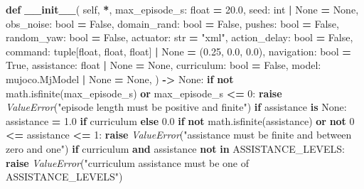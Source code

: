 \documentclass[
  chinese,
  11pt,
  letterpaper,
]{article}
\newenvironment{Shaded}{\begin{snugshade}}{\end{snugshade}}
\newcommand{\BuiltInTok}[1]{#1}
\newcommand{\ControlFlowTok}[1]{\textcolor[rgb]{0.13,0.29,0.53}{\textbf{#1}}}
\newcommand{\DecValTok}[1]{\textcolor[rgb]{0.00,0.00,0.81}{#1}}
\newcommand{\FloatTok}[1]{\textcolor[rgb]{0.00,0.00,0.81}{#1}}
\newcommand{\FunctionTok}[1]{\textcolor[rgb]{0.13,0.29,0.53}{\textbf{#1}}}
\newcommand{\KeywordTok}[1]{\textcolor[rgb]{0.13,0.29,0.53}{\textbf{#1}}}
\newcommand{\NormalTok}[1]{#1}
\newcommand{\OperatorTok}[1]{\textcolor[rgb]{0.81,0.36,0.00}{\textbf{#1}}}
\newcommand{\PreprocessorTok}[1]{\textcolor[rgb]{0.56,0.35,0.01}{\textit{#1}}}
\newcommand{\StringTok}[1]{\textcolor[rgb]{0.31,0.60,0.02}{#1}}
\newcommand{\VariableTok}[1]{\textcolor[rgb]{0.00,0.00,0.00}{#1}}
\renewenvironment{Shaded}{\par\smallskip}{\par\smallskip}
\begin{document}
\begin{Shaded}
\begin{Highlighting}[]
    \KeywordTok{def} \FunctionTok{\_\_init\_\_}\NormalTok{(}
        \VariableTok{self}\NormalTok{,}
        \OperatorTok{*}\NormalTok{,}
\NormalTok{        max\_episode\_s: }\BuiltInTok{float} \OperatorTok{=} \FloatTok{20.0}\NormalTok{,}
\NormalTok{        seed: }\BuiltInTok{int} \OperatorTok{|} \VariableTok{None} \OperatorTok{=} \VariableTok{None}\NormalTok{,}
\NormalTok{        obs\_noise: }\BuiltInTok{bool} \OperatorTok{=} \VariableTok{False}\NormalTok{,}
\NormalTok{        domain\_rand: }\BuiltInTok{bool} \OperatorTok{=} \VariableTok{False}\NormalTok{,}
\NormalTok{        pushes: }\BuiltInTok{bool} \OperatorTok{=} \VariableTok{False}\NormalTok{,}
\NormalTok{        random\_yaw: }\BuiltInTok{bool} \OperatorTok{=} \VariableTok{False}\NormalTok{,}
\NormalTok{        actuator: }\BuiltInTok{str} \OperatorTok{=} \StringTok{"xml"}\NormalTok{,}
\NormalTok{        action\_delay: }\BuiltInTok{bool} \OperatorTok{=} \VariableTok{False}\NormalTok{,}
\NormalTok{        command: }\BuiltInTok{tuple}\NormalTok{[}\BuiltInTok{float}\NormalTok{, }\BuiltInTok{float}\NormalTok{, }\BuiltInTok{float}\NormalTok{] }\OperatorTok{|} \VariableTok{None} \OperatorTok{=}\NormalTok{ (}\FloatTok{0.25}\NormalTok{, }\FloatTok{0.0}\NormalTok{, }\FloatTok{0.0}\NormalTok{),}
\NormalTok{        navigation: }\BuiltInTok{bool} \OperatorTok{=} \VariableTok{True}\NormalTok{,}
\NormalTok{        assistance: }\BuiltInTok{float} \OperatorTok{|} \VariableTok{None} \OperatorTok{=} \VariableTok{None}\NormalTok{,}
\NormalTok{        curriculum: }\BuiltInTok{bool} \OperatorTok{=} \VariableTok{False}\NormalTok{,}
\NormalTok{        model: mujoco.MjModel }\OperatorTok{|} \VariableTok{None} \OperatorTok{=} \VariableTok{None}\NormalTok{,}
\NormalTok{    ) }\OperatorTok{{-}\textgreater{}} \VariableTok{None}\NormalTok{:}
        \ControlFlowTok{if} \KeywordTok{not}\NormalTok{ math.isfinite(max\_episode\_s) }\KeywordTok{or}\NormalTok{ max\_episode\_s }\OperatorTok{\textless{}=} \DecValTok{0}\NormalTok{:}
            \ControlFlowTok{raise} \PreprocessorTok{ValueError}\NormalTok{(}\StringTok{"episode length must be positive and finite"}\NormalTok{)}
        \ControlFlowTok{if}\NormalTok{ assistance }\KeywordTok{is} \VariableTok{None}\NormalTok{:}
\NormalTok{            assistance }\OperatorTok{=} \FloatTok{1.0} \ControlFlowTok{if}\NormalTok{ curriculum }\ControlFlowTok{else} \FloatTok{0.0}
        \ControlFlowTok{if} \KeywordTok{not}\NormalTok{ math.isfinite(assistance) }\KeywordTok{or} \KeywordTok{not} \DecValTok{0} \OperatorTok{\textless{}=}\NormalTok{ assistance }\OperatorTok{\textless{}=} \DecValTok{1}\NormalTok{:}
            \ControlFlowTok{raise} \PreprocessorTok{ValueError}\NormalTok{(}\StringTok{"assistance must be finite and between zero and one"}\NormalTok{)}
        \ControlFlowTok{if}\NormalTok{ curriculum }\KeywordTok{and}\NormalTok{ assistance }\KeywordTok{not} \KeywordTok{in}\NormalTok{ ASSISTANCE\_LEVELS:}
            \ControlFlowTok{raise} \PreprocessorTok{ValueError}\NormalTok{(}\StringTok{"curriculum assistance must be one of ASSISTANCE\_LEVELS"}\NormalTok{)}


\end{Highlighting}
\end{Shaded}
\end{document}

